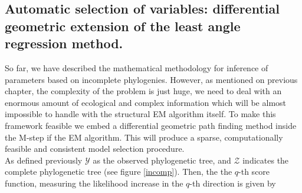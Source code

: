 \vspace{1cm}



\subsection{Automatic selection of variables: differential geometric extension of the least angle regression method.}

So far, we have described the mathematical methodology for inference of parameters based on incomplete phylogenies. However, as mentioned on previous chapter, the complexity of the problem is just huge, we need to deal with an enormous amount of ecological and complex information which will be almost impossible to handle with the structural EM algorithm itself. To make this framework feasible we embed a differential geometric path finding method \cite{augugliaro2013differential} inside the M-step if the EM algorithm. This will produce a sparse, computationally feasible and consistent model selection procedure. \\


As defined previously $\mathcal{Y}$ as the observed phylogenetic tree, and $\mathcal{Z}$ indicates the complete phylogenetic tree (see figure \ref{incomp}). Then, the the $q$-th score function, measuring the likelihood increase in the $q$-th direction is given by 

